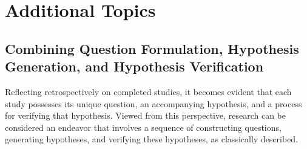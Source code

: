 


\section{Additional Topics}

\subsection{Combining Question Formulation, Hypothesis Generation, and Hypothesis Verification}
Reflecting retrospectively on completed studies, it becomes evident that each study possesses its unique question, an accompanying hypothesis, and a process for verifying that hypothesis. Viewed from this perspective, research can be considered an endeavor that involves a sequence of constructing questions, generating hypotheses, and verifying these hypotheses, as classically described.

